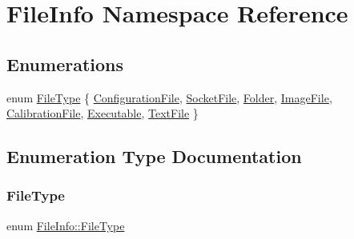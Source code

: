 \hypertarget{namespace_file_info}{}\section{File\+Info Namespace Reference}
\label{namespace_file_info}
\subsection*{Enumerations}
\begin{DoxyCompactItemize}
\item 
enum \mbox{\hyperlink{namespace_file_info_a061391d645c7825487ebb57cc2ff2752}{File\+Type}} \{ \newline
\mbox{\hyperlink{namespace_file_info_a061391d645c7825487ebb57cc2ff2752a89179b71dffc59f77a07b941b5be1489}{Configuration\+File}}, 
\mbox{\hyperlink{namespace_file_info_a061391d645c7825487ebb57cc2ff2752ad1d5942c086937f7de31ebd2d75ce4b0}{Socket\+File}}, 
\mbox{\hyperlink{namespace_file_info_a061391d645c7825487ebb57cc2ff2752a3c1ddc27d3a11a7e28a2de1151c9b415}{Folder}}, 
\mbox{\hyperlink{namespace_file_info_a061391d645c7825487ebb57cc2ff2752a367795a2cc834b1cb309bb64cb122138}{Image\+File}}, 
\newline
\mbox{\hyperlink{namespace_file_info_a061391d645c7825487ebb57cc2ff2752a98141c146a660b57571ba76a11b2fd13}{Calibration\+File}}, 
\mbox{\hyperlink{namespace_file_info_a061391d645c7825487ebb57cc2ff2752a45a1f2bec91f40158a03babdb08c606d}{Executable}}, 
\mbox{\hyperlink{namespace_file_info_a061391d645c7825487ebb57cc2ff2752a27f63f9e61146267d9d4ccbb96990dbd}{Text\+File}}
 \}
\end{DoxyCompactItemize}


\subsection{Enumeration Type Documentation}
\mbox{\label{namespace_file_info_a061391d645c7825487ebb57cc2ff2752}} 
\subsubsection{\texorpdfstring{FileType}{FileType}}
{\footnotesize\ttfamily enum \mbox{\hyperlink{namespace_file_info_a061391d645c7825487ebb57cc2ff2752}{File\+Info\+::\+File\+Type}}}

